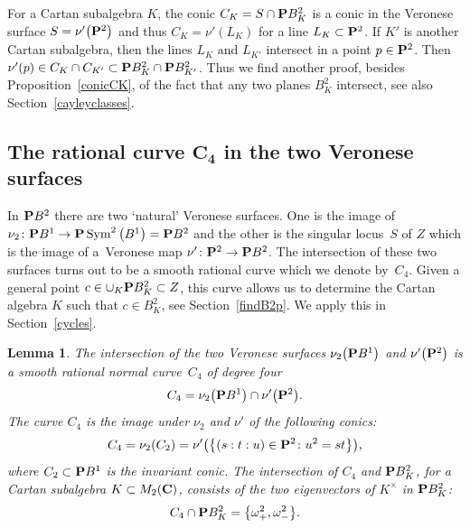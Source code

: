 \documentclass[10pt,a4paper]{amsart}
\numberwithin{equation}{section}
\newtheorem{Lemma}[Theorem]{Lemma}
\begin{document}
\begin{Remark} \label{linesLK}
For a Cartan subalgebra $K$, the conic $C_K=S\cap {\bf P} B^2_K$
is a conic in the Veronese surface $S=\nu'\big({\bf P}^2\big)$
and thus $C_K=\nu'(L_K)$ for a line $L_K\subset {\bf P}^2$. If $K'$ is another Cartan subalgebra,
then the lines $L_K$ and $L_{K'}$ intersect in a point $p\in {\bf P}^2$. Then
$\nu'(p)\in C_K\cap C_{K'}\subset {\bf P} B^2_K\cap {\bf P} B^2_{K'}$. Thus we find another proof, besides
Proposition~\ref{conicCK}, of the fact that any two planes $B^2_K$ intersect,
see also Section~\ref{cayleyclasses}.
\end{Remark}

\subsection[The rational curve C\_4 in the two Veronese surfaces]{The rational curve $\boldsymbol{C_4}$ in the two Veronese surfaces}

In ${\bf P} B^2$ there are two `natural' Veronese surfaces.
One is the image of $\nu_2\colon {\bf P} B^1\rightarrow {\bf P} \operatorname{Sym}^2\big(B^1\big)\allowbreak ={\bf P} B^2$ and the other is
the singular locus~$S$ of $Z$ which is the image of a~Veronese map $\nu'\colon {\bf P}^2\allowbreak \rightarrow {\bf P} B^2$.
The intersection of these two surfaces turns out to be a smooth rational
curve which we denote by~$C_4$.
Given a general point $c\in \cup_K {\bf P} B^2_K\subset Z$, this curve allows us to determine
the Cartan algebra $K$ such that $c\in B^2_K$, see Section~\ref{findB2p}.
We apply this in Section~\ref{cycles}.

\begin{Lemma}\label{quarticc4}\label{C4B2p}
The intersection of the two Veronese surfaces $\nu_2\big({\bf P} B^1\big)$ and $\nu'\big({\bf P}^2\big)$
is a smooth rational normal curve~$C_4$ of degree four
\[
C_4 = \nu_2\big({\bf P} B^1\big) \cap \nu'\big({\bf P}^2\big).
\]
The curve $C_4$ is the image under $\nu_2$ and $\nu'$ of the following conics:
\[
C_4 = \nu_2(C_2) = \nu'\big(\big\{(s:t:u)\in{\bf P}^2\colon u^2=st \big\}\big),
\]
where $C_2\subset{\bf P} B^1$ is the invariant conic.
The intersection of $C_4$ and ${\bf P} B^2_K$, for a Cartan subalgebra $K\subset M_2({\bf C})$,
consists of the two eigenvectors of $K^\times$ in ${\bf P} B^2_K$:
\[
C_4 \cap {\bf P} B^2_K = \big\{\omega_+^2, \omega_-^2 \big\}.
\]
\end{Lemma}
\end{document}
